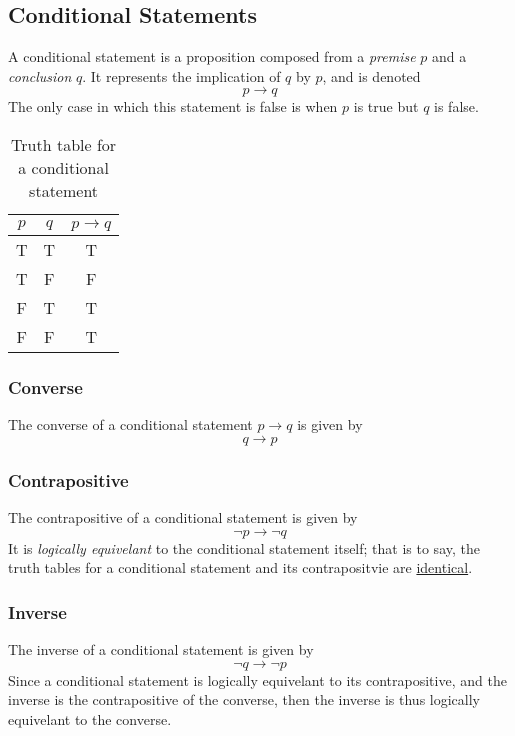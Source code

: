 \documentclass[twocolumn]{report}
\begin{document}
\subsection{Conditional Statements}
A conditional statement is a proposition composed from a \textit{premise} $p$ and a \textit{conclusion} $q$. 
It represents the implication of $q$ by $p$, and is denoted 
\[
	p \rightarrow q
\]
The only case in which this statement is false is when $p$ is true but $q$ is false. 
\begin{table}[h]
	\centering
	\label{tab: conditional-statement-truth-table}
	\begin{tabular}{cc|c}
		$p$ & $q$ & $p \rightarrow q$ \\ \hline
		T & T & T \\
		T & F & F \\
		F & T & T \\
		F & F & T \\
	\end{tabular}
	\caption{Truth table for a conditional statement}
\end{table}

\subsubsection{Converse}
The converse of a conditional statement $p \rightarrow q$ is given by
\[
	q \rightarrow p
\]

\subsubsection{Contrapositive}
The contrapositive of a conditional statement is given by 
\[
	\neg p \rightarrow \neg q 
\]
It is \textit{logically equivelant} to the conditional statement itself; that is to say, the truth tables for a conditional statement and its contrapositvie are \underline{identical}. 

\subsubsection{Inverse}
The inverse of a conditional statement is given by
\[
	\neg q \rightarrow \neg p
\]
Since a conditional statement is logically equivelant to its contrapositive, and the inverse is the contrapositive of the converse, then the inverse is thus logically equivelant to the converse.
\end{document}
